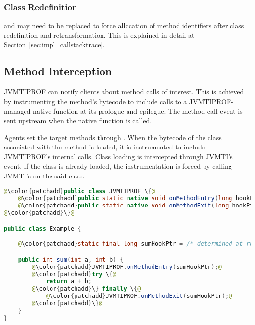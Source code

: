 \subsubsection*{Class Redefinition}

 and  may need to be replaced to force allocation of method identifiers after class redefinition and retransformation. This is explained in detail at Section~\ref{sec:impl_callstacktrace}.

\subsection{Method Interception}

JVMTIPROF can notify clients about method calls of interest. This is achieved by instrumenting the method's bytecode to include calls to a JVMTIPROF-managed native function at its prologue and epilogue. The method call event is sent upstream when the native function is called.

Agents set the target methods through . When the bytecode of the class associated with the method is loaded, it is instrumented to include JVMTIPROF's internal calls. Class loading is intercepted through JVMTI's   event. If the class is already loaded, the instrumentation is forced by calling JVMTI's  on the said class.

\medskip
\begin{lstlisting}[language=Java,frame=tb,escapechar=@,captionpos=b,caption=Example instrumentation applied by method interception. Instrumented code is in gray. The \code{sum} method is modified such that JVMTIPROF is notified about entries and exits on it.,label=lst:method_interception_instrumentation]
@\color{patchadd}public class JVMTIPROF \{@
    @\color{patchadd}public static native void onMethodEntry(long hookPtr);@
    @\color{patchadd}public static native void onMethodExit(long hookPtr);@
@\color{patchadd}\}@

public class Example {

    @\color{patchadd}static final long sumHookPtr = /* determined at runtime */;@

    public int sum(int a, int b) {
        @\color{patchadd}JVMTIPROF.onMethodEntry(sumHookPtr);@
        @\color{patchadd}try \{@
            return a + b;
        @\color{patchadd}\} finally \{@
            @\color{patchadd}JVMTIPROF.onMethodExit(sumHookPtr);@
        @\color{patchadd}\}@
    }
}
\end{lstlisting}

